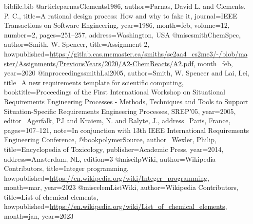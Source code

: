 \documentclass[12pt]{article}
\begin{document}
\begin{filecontents*}{bibfile.bib}
@article{parnasClements1986,
author={Parnas, David L. and Clements, P. C.},
title={A rational design process: How and why to fake it},
journal={IEEE Transactions on Software Engineering},
year={1986},
month=feb,
volume={12},
number={2},
pages={251--257},
address={Washington, USA}}
@misc{smithChemSpec,
author={Smith, W. Spencer},
title={Assignment 2},
howpublished={\url{https://gitlab.cas.mcmaster.ca/smiths/se2aa4\_cs2me3/-/blob/master/Assignments/PreviousYears/2020/A2-ChemReacts/A2.pdf}},
month=feb,
year={2020}}
@inproceedings{smithLai2005,
author={Smith, W. Spencer and Lai, Lei},
title={A new requirements template for scientific computing},
booktitle={Proceedings of the First International Workshop on Situational Requirements Engineering Processes - Methods, Techniques and Tools to Support Situation-Specific Requirements Engineering Processes, SREP'05},
year={2005},
editor={Agerfalk, PJ and Kraiem, N. and Ralyte, J.},
address={Paris, France},
pages={107--121},
note={In conjunction with 13th IEEE International Requirements Engineering Conference,}}
@book{polymerSource,
author={Wexler, Philip},
title={Encyclopedia of Toxicology},
publisher={Academic Press},
year={2014},
address={Amsterdam, NL},
edition={3}}
@misc{ilpWiki,
author={Wikipedia Contributors},
title={Integer programming},
howpublished={\url{https://en.wikipedia.org/wiki/Integer\_programming}},
month=mar,
year={2023}}
@misc{elemListWiki,
author={Wikipedia Contributors},
title={List of chemical elements},
howpublished={\url{https://en.wikipedia.org/wiki/List\_of\_chemical\_elements}},
month=jan,
year={2023}}
\end{filecontents*}
\nocite{*}
\printbibliography[heading=none]
\end{document}

